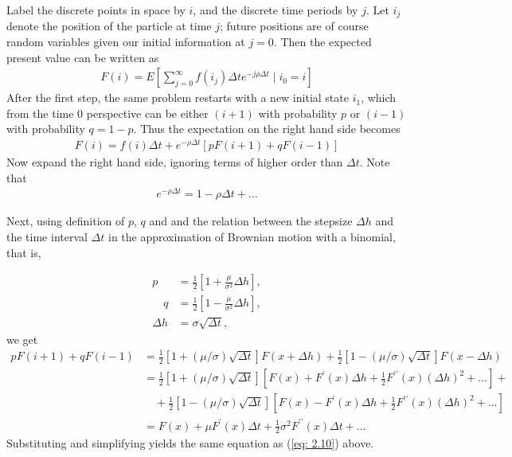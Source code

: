 \documentclass[\topdir/lecture\_notes.tex]{subfiles}
\begin{document}
Label the discrete points in space by $i$, and the discrete time periods by $j$. Let $i_{j}$ denote the position of the particle at time $j$; future positions are of course random variables given our initial information at $j=0$. Then the expected present value can be written as
\begin{align*}
F(i)=E\left[\sum_{j=0}^{\infty} f(i_{j}) \Delta t e^{-j \rho \Delta t} \mid i_{0}=i\right]
\end{align*}
After the first step, the same problem restarts with a new initial state $i_{1}$, which from the time $0$ perspective can be either $(i+1)$ with probability $p$ or $(i-1)$ with probability $q=1-p$. Thus the expectation on the right hand side becomes
\begin{align*}
F(i)=f(i) \Delta t+e^{-\rho \Delta t}[p F(i+1)+q F(i-1)]
\end{align*}
Now expand the right hand side, ignoring terms of higher order than $\Delta t$. Note that
\begin{align*}
e^{-\rho \Delta t}=1-\rho \Delta t+\ldots
\end{align*}

Next, using definition of $p$, $q$ and and the relation between the stepsize $\Delta h$ and the time interval $\Delta t$ in the approximation of Brownian motion with a binomial, that is,

\begin{align*}
p&=\frac{1}{2}\left[1+\frac{\mu}{\sigma^{2}} \Delta h\right],\\
\quad q&=\frac{1}{2}\left[1-\frac{\mu}{\sigma^{2}} \Delta h\right],\\
\Delta h&=\sigma \sqrt{\Delta t},
\end{align*}
we get
\begin{align*}
p F(i+1)+q F(i-1) &= \frac{1}{2}\left[1+(\mu / \sigma) \sqrt{\Delta t}\right] F(x+\Delta h) +\frac{1}{2}\left[1-(\mu / \sigma) \sqrt{\Delta t}\right] F(x-\Delta h) \\
&= \frac{1}{2}\left[1+(\mu / \sigma) \sqrt{\Delta t}\right]\left[F(x)+F^{\prime}(x) \Delta h+\frac{1}{2} F^{\prime \prime}(x)(\Delta h)^{2}+\ldots\right] + \\
&\quad +\frac{1}{2}\left[1-(\mu / \sigma) \sqrt{\Delta t}\right]\left[F(x)-F^{\prime}(x) \Delta h+\frac{1}{2} F^{\prime \prime}(x)(\Delta h)^{2}+\ldots\right] \\
& =  F(x)+\mu F^{\prime}(x) \Delta t+\frac{1}{2} \sigma^{2} F^{\prime \prime}(x) \Delta t+\ldots
\end{align*}
Substituting and simplifying yields the same equation as (\ref{eq: 2.10}) above.
\end{document}
